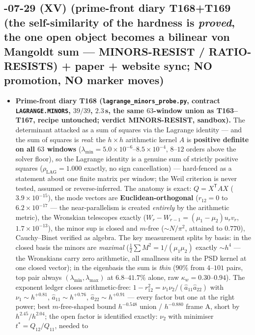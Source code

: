 \documentclass[11pt]{article}
\begin{document}
\subsection*{-07-29 (XV) (prime-front diary T168+T169 (the self-similarity of the hardness is \emph{proved}, the one open object becomes a bilinear von Mangoldt sum --- MINORS-RESIST / RATIO-RESISTS) + paper + website sync; NO promotion, NO marker moves)}
\begin{itemize}[leftmargin=1.5em]
\item \textbf{Prime-front diary T168 (\texttt{lagrange\_minors\_probe.py}, contract
\texttt{LAGRANGE.MINORS}, $39/39$, $2.3$\,s, the same $63$-window union as
T163--T167, recipe untouched; verdict MINORS-RESIST, sandbox).} The determinant
attacked as a sum of squares via the Lagrange identity --- and the sum of
squares is \emph{real}: the $h\times h$ arithmetic kernel $A$ is
\textbf{positive definite on all $63$ windows}
($\lambda_{\min}=5.0\times10^{-6}$--$8.5\times10^{-4}$, $8$--$12$ orders above
the solver floor), so the Lagrange identity is a genuine sum of strictly
positive squares ($\rho_{\mathrm{LAG}}=1.000$ exactly, no sign cancellation)
--- hard-fenced as a statement about one finite matrix per window; the Weil
criterion is never tested, assumed or reverse-inferred. The anatomy is exact:
$Q=X^{\mathsf T}AX$ ($3.9\times10^{-15}$), the mode vectors are
\textbf{Euclidean-orthogonal} ($r_{12}=0$ to $6.2\times10^{-17}$ --- the
near-parallelism is created \emph{entirely} by the arithmetic metric), the
Wronskian telescopes exactly ($W_r-W_{r-1}=(\mu_1-\mu_2)u_rv_r$,
$1.7\times10^{-13}$), the minor sup is closed and $m$-free ($\sim N/\pi^2$,
attained to $0.770$), Cauchy--Binet verified as algebra. The key measurement
splits by basis: in the closed basis the minors are \emph{maximal}
($\tfrac12\sum M^2=1/(\mu_1\mu_2)$ exactly $\sim h^4$ --- the Wronskians carry
zero arithmetic, all smallness sits in the PSD kernel at one closed vector);
in the eigenbasis the sum is \emph{thin} ($90\%$ from $4$--$101$ pairs, top
pair always $(\lambda_{\min},\lambda_{\max})$ at $6.8$--$41.7\%$ alone, raw
$\kappa_w=0.30$--$0.94$). The exponent ledger closes arithmetic-free:
$1-r_{12}^2=\nu_1\nu_2/(\hat a_{11}\hat a_{22})$ with $\nu_1\sim h^{+0.81}$,
$\hat a_{11}\sim h^{+0.76}$, $\hat a_{22}\sim h^{+0.91}$ --- every factor but
one at the right power; best $m$-free-shaped bound $h^{-0.548}$ union /
$h^{-0.880}$ frame A, short by $h^{2.45}/h^{2.04}$; the open factor is
identified exactly: $\nu_2$ with minimiser $t^*=Q_{12}/Q_{11}$, needed to

\end{itemize}
\end{document}

